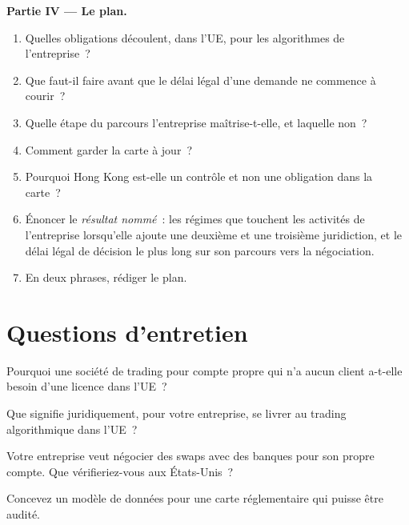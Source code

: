 \begin{problem}
\medskip\noindent\textbf{Partie IV --- Le plan.}
\begin{enumerate}[resume]
\item Quelles obligations découlent, dans l'UE, pour les algorithmes de l'entreprise~?
\item Que faut-il faire avant que le délai légal d'une demande ne commence à courir~?
\item Quelle étape du parcours l'entreprise maîtrise-t-elle, et laquelle non~?
\item Comment garder la carte à jour~?
\item Pourquoi Hong Kong est-elle un contrôle et non une obligation dans la carte~?
\item Énoncer le \emph{résultat nommé}~: les régimes que touchent les activités de l'entreprise lorsqu'elle ajoute une deuxième et une troisième juridiction, et le délai
légal de décision le plus long sur son parcours vers la négociation.
\item En deux phrases, rédiger le plan.
\end{enumerate}
\end{problem}

\section{Questions d'entretien}

\begin{interviewq}\label{iq:fm:regulators-and-licences:1}
Pourquoi une société de trading pour compte propre qui n'a aucun client a-t-elle besoin d'une licence dans l'UE~?
\end{interviewq}

\begin{interviewq}\label{iq:fm:regulators-and-licences:2}
Que signifie juridiquement, pour votre entreprise, se livrer au trading algorithmique dans l'UE~?
\end{interviewq}

\begin{interviewq}\label{iq:fm:regulators-and-licences:3}
Votre entreprise veut négocier des swaps avec des banques pour son propre compte. Que vérifieriez-vous aux États-Unis~?
\end{interviewq}

\begin{interviewq}\label{iq:fm:regulators-and-licences:4}
Concevez un modèle de données pour une carte réglementaire qui puisse être audité.
\end{interviewq}

